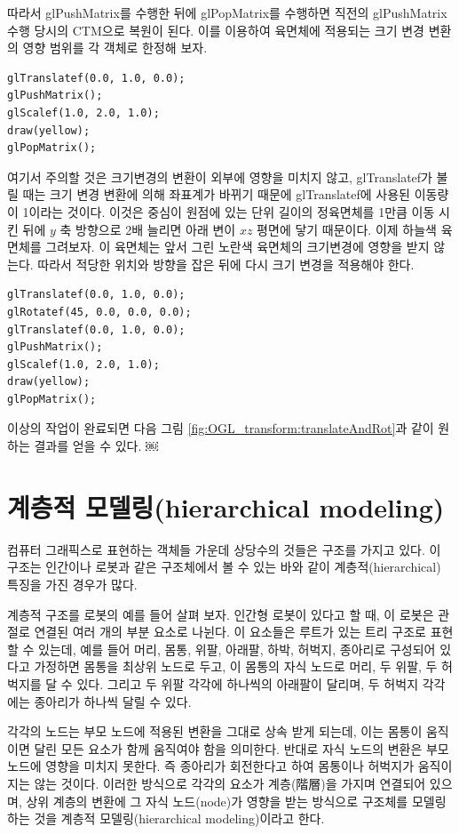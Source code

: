 따라서 {\sf glPushMatrix}를 수행한 뒤에 {\sf glPopMatrix}를 수행하면 직전의 {\sf glPushMatrix} 수행 당시의 CTM으로 복원이 된다. 이를 이용하여 육면체에 적용되는 크기 변경 변환의 영향 범위를 각 객체로 한정해 보자.

\begin{verbatim}
glTranslatef(0.0, 1.0, 0.0);
glPushMatrix();
glScalef(1.0, 2.0, 1.0);
draw(yellow);
glPopMatrix();
\end{verbatim}

여기서 주의할 것은 크기변경의 변환이 외부에 영향을 미치지 않고, {\sf glTranslatef}가 불릴 때는 크기 변경 변환에 의해 좌표계가 바뀌기 때문에 {\sf glTranslatef}에 사용된 이동량이 1이라는 것이다. 이것은 중심이 원점에 있는 단위 길이의 정육면체를 1만큼 이동 시킨 뒤에 $y$ 축 방향으로 2배 늘리면 아래 변이 $xz$ 평면에 닿기 때문이다. 
이제 하늘색 육면체를 그려보자. 이 육면체는 앞서 그린 노란색 육면체의 크기변경에 영향을 받지 않는다. 따라서 적당한 위치와 방향을 잡은 뒤에 다시 크기 변경을 적용해야 한다.

\begin{verbatim}
glTranslatef(0.0, 1.0, 0.0);
glRotatef(45, 0.0, 0.0, 0.0);
glTranslatef(0.0, 1.0, 0.0);
glPushMatrix();
glScalef(1.0, 2.0, 1.0);
draw(yellow);
glPopMatrix();
\end{verbatim}


이상의 작업이 완료되면 다음 그림 \ref{fig:OGL_transform:translateAndRot}과 같이 원하는 결과를 얻을 수 있다.
￼


\section{계층적 모델링(hierarchical modeling)}

컴퓨터 그래픽스로 표현하는 객체들 가운데 상당수의 것들은 구조를 가지고 있다. 이 구조는 인간이나 로봇과 같은 구조체에서 볼 수 있는 바와 같이 계층적(hierarchical) 특징을 가진 경우가 많다.

계층적 구조를 로봇의 예를 들어 살펴 보자. 인간형 로봇이 있다고 할 때, 이 로봇은 관절로 연결된 여러 개의 부분 요소로 나뉜다. 이 요소들은 루트가 있는 트리 구조로 표현할 수 있는데, 예를 들어 머리, 몸통, 위팔, 아래팔, 하박, 허벅지, 종아리로 구성되어 있다고 가정하면 몸통을 최상위 노드로 두고, 이 몸통의 자식 노드로 머리, 두 위팔, 두 허벅지를 달 수 있다. 그리고 두 위팔 각각에 하나씩의 아래팔이 달리며, 두 허벅지 각각에는 종아리가 하나씩 달릴 수 있다. 

각각의 노드는 부모 노드에 적용된 변환을 그대로 상속 받게 되는데, 이는 몸통이 움직이면 달린 모든 요소가 함께 움직여야 함을 의미한다. 반대로 자식 노드의 변환은 부모 노드에 영향을 미치지 못한다. 즉 종아리가 회전한다고 하여 몸통이나 허벅지가 움직이지는 않는 것이다. 이러한 방식으로 각각의 요소가 계층(階層)을 가지며
연결되어 있으며, 상위 계층의 변환에 그 자식 노드(node)가 영향을 받는 방식으로 구조체를 모델링하는 것을 계층적 모델링(hierarchical modeling)이라고 한다.

